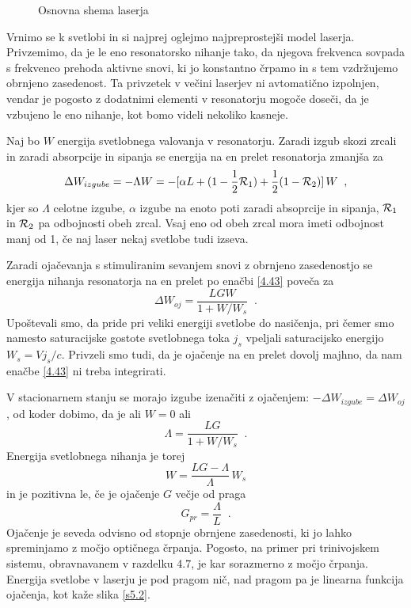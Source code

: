 \begin{figure}[tbp]
\label{s5.1} \vskip 5cm
\caption{Osnovna shema laserja}
\end{figure}

Vrnimo se k svetlobi in si najprej oglejmo najpreprostejši model laserja.
Privzemimo, da je le eno resonatorsko nihanje tako, da njegova frekvenca
sovpada s frekvenco prehoda aktivne snovi, ki jo konstantno črpamo in s tem
vzdržujemo obrnjeno zasedenost. Ta privzetek v večini laserjev ni
avtomatično izpolnjen, vendar je pogosto z dodatnimi elementi v resonatorju
mogoče doseči, da je vzbujeno le eno nihanje, kot bomo videli nekoliko
kasneje.

Naj bo $W$ energija svetlobnega valovanja v resonatorju. Zaradi izgub skozi
zrcali in zaradi absorpcije in sipanja se energija na en prelet resonatorja
zmanjša za 
\begin{equation}
\Delta W_{izgube}=-\Lambda W=-[\alpha L+(1-\frac{1}{2}{\cal {R}}_{1})+\frac{1%
}{2}(1-{\cal {R}}_{2})]\,W\;\;,  \label{5.1}
\end{equation}
kjer so $\Lambda $ celotne izgube, $\alpha $ izgube na enoto poti zaradi
absoprcije in sipanja, ${\cal {R}}_{1}$ in ${\cal {R}}_{2}$ pa odbojnosti
obeh zrcal. Vsaj eno od obeh zrcal mora imeti odbojnost manj od 1, če naj
laser nekaj svetlobe tudi izseva.

Zaradi ojačevanja s stimuliranim sevanjem snovi z obrnjeno zasedenostjo se
energija nihanja resonatorja na en prelet po enačbi \ref{4.43} poveča za 
\begin{equation}  \label{5.2}
\Delta W_{oj}=\frac{LGW}{1+W/W_s}\;\;.
\end{equation}
Upoštevali smo, da pride pri veliki energiji svetlobe do nasičenja, pri
čemer smo namesto saturacijske gostote svetlobnega toka $j_s$ vpeljali
saturacijsko energijo $W_s=Vj_s/c$. Privzeli smo tudi, da je ojačenje na en
prelet dovolj majhno, da nam enačbe \ref{4.43} ni treba integrirati.

V stacionarnem stanju se morajo izgube izenačiti z ojačenjem: \newline
$-\Delta W_{izgube}=\Delta W_{oj}$, od koder dobimo, da je ali $W=0$ ali 
\begin{equation}  \label{5.3}
\Lambda=\frac{LG}{1+W/W_s}\;\;.
\end{equation}
Energija svetlobnega nihanja je torej 
\begin{equation}  \label{5.4}
W=\frac{LG-\Lambda}{\Lambda}\,W_s
\end{equation}
in je pozitivna le, če je ojačenje $G$ večje od praga 
\begin{equation}  \label{5.5}
G_{pr}=\frac{\Lambda}{L}\;\;.
\end{equation}
Ojačenje je seveda odvisno od stopnje obrnjene zasedenosti, ki jo lahko
spreminjamo z močjo optičnega črpanja. Pogosto, na primer pri
trinivojskem sistemu, obravnavanem v razdelku 4.7, je kar sorazmerno z
močjo črpanja. Energija svetlobe v laserju je pod pragom nič, nad pragom
pa je linearna funkcija ojačenja, kot kaže slika \ref{s5.2}.

